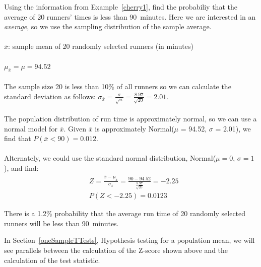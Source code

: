 \begin{examplewrap}
\begin{nexample}{
Using the information from Example~\ref{cherry1}, find the probabiliy that the average of 20 runners' times is less than 90~minutes.}
Here we are interested in an \emph{average}, so we use the sampling distribution of the sample average.  \\ \\
$\bar{x}$: sample mean of 20 randomly selected runners (in minutes)\\ \\
$\mu_{\bar{x}}=\mu=94.52$\\ \\
The sample size 20 is less than 10\% of all runners so we can calculate the standard deviation as follows:
$\sigma_{\bar{x}}=\frac{\sigma}{\sqrt{n}}=\frac{8.97}{\sqrt{20}}=2.01$. \\ \\
The population distribution of run time is approximately normal, so we can use a normal model for $\bar{x}$.  Given $\bar{x}$ is approximately Normal($\mu$ = 94.52, $\sigma$ = 2.01), we find that $P(\bar{x} < 90) = 0.012$.\\ \\
Alternately, we could use the standard normal distribution, Normal($\mu=0$, $\sigma=1$), and find:
\begin{align*}
&Z = \frac{\bar{x} - \mu_{\bar{x}}}{\sigma_{\bar{x}}}=\frac{90 - 94.52}{\frac{8.97}{\sqrt{20}}}=-2.25\\
&P(Z < -2.25) = 0.0123
\end{align*}
\begin{center}
  \hspace{5mm}
\end{center}
There is a 1.2\% probability that the average run time of 20 randomly selected runners will be less than 90~minutes.
\label{cherry20}
\end{nexample}
\end{examplewrap}

In Section~\ref{oneSampleTTests}, Hypothesis testing for a population mean, we will see parallels between the calculation of the Z-score shown above and the calculation of the test statistic.

